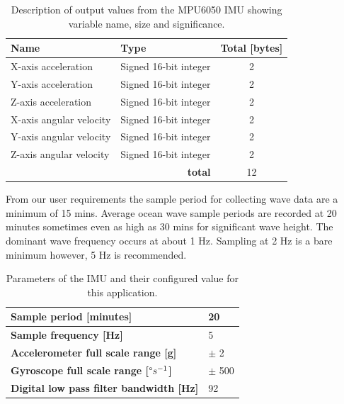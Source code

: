 \begin{table}[H]
	\centering
	\caption{Description of output values from the MPU6050 IMU showing variable name, size and significance.}
	\setlength{\extrarowheight}{5pt}
	\begin{tabular}{llc}
		\hline
		\textbf{Name} & \textbf{Type} &\textbf{Total [bytes]} \\
		\hline
		\hline
		X-axis acceleration & Signed 16-bit integer & 2\\
		\hline
		Y-axis acceleration & Signed 16-bit integer & 2\\
		\hline
		Z-axis acceleration & Signed 16-bit integer & 2\\
		\hline
		X-axis angular velocity & Signed 16-bit integer & 2\\
		 \hline
		Y-axis angular velocity & Signed 16-bit integer & 2\\
		\hline
		Z-axis angular velocity & Signed 16-bit integer & 2\\
		\hline
		\hline
		\multicolumn{2}{r}{\textbf{total}} &\multicolumn{1}{c}{12}\\
		\cline{3-3}
		\cline{3-3}
	\end{tabular}
	
	\label{tab:IMU_data_outl}
\end{table}

From our user requirements the sample period for collecting wave data are a minimum of 15 mins. Average ocean wave sample periods are recorded at 20 minutes sometimes even as high as 30 mins for significant wave height. The dominant wave frequency occurs at about 1 Hz. Sampling at 2 Hz \cite{kohout2015device} is a bare minimum however, 5 Hz is recommended. 

\begin{table}[H]
	\centering
	\caption{Parameters of the IMU and their configured value for this application.}
	\setlength{\extrarowheight}{5pt}
	\label{tab:IMU_param}
	\begin{tabular}{ll}
		\hline
		\hline
		\textbf{Sample period [minutes]}   &  20 \\
		\hline
		\textbf{Sample frequency [Hz]} & 5 \\
		\hline
		\textbf{Accelerometer full scale range [g]} & $\pm$ 2\\ 
		\hline
		\textbf{Gyroscope full scale range [$\degree s^{-1}$]} & $\pm$ 500\\
		\hline
		\textbf{Digital low pass filter bandwidth [Hz]} & 92\\ 
		\hline
		\hline
	\end{tabular}

\end{table}

